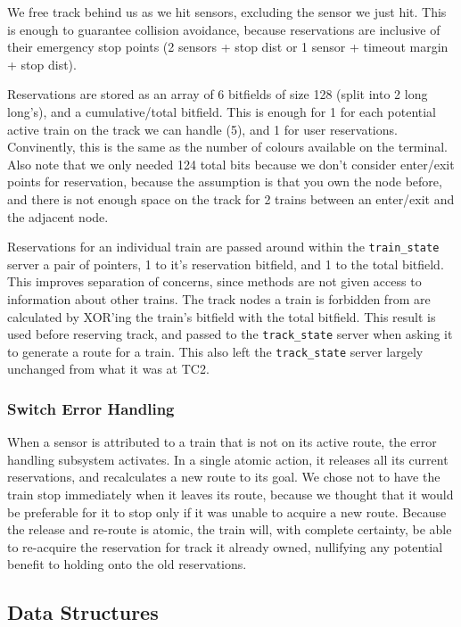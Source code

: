 \documentclass{article}
\begin{document}
We free track behind us as we hit sensors, excluding the sensor we just hit. This is enough to guarantee collision avoidance, because reservations are inclusive of their emergency stop points (2 sensors + stop dist or 1 sensor + timeout margin + stop dist).

Reservations are stored as an array of 6 bitfields of size 128 (split into 2 long long's), and a cumulative/total bitfield.
This is enough for 1 for each potential active train on the track we can handle (5), and 1 for user reservations.
Convinently, this is the same as the number of colours available on the terminal.
Also note that we only needed 124 total bits because we don't consider enter/exit points for reservation, because the assumption is that you own the node before, and there is not enough space on the track for 2 trains between an enter/exit and the adjacent node.

Reservations for an individual train are passed around within the \verb|train_state| server a pair of pointers, 1 to it's reservation bitfield, and 1 to the total bitfield. This improves separation of concerns, since methods are not given access to information about other trains. The track nodes a train is forbidden from are calculated by XOR'ing the train's bitfield with the total bitfield. This result is used before reserving track, and passed to the \verb|track_state| server when asking it to generate a route for a train. This also left the \verb|track_state| server largely unchanged from what it was at TC2.

\subsubsection{Switch Error Handling}
When a sensor is attributed to a train that is not on its active route, the error handling subsystem activates. In a single atomic action, it releases all its current reservations, and recalculates a new route to its goal. 
We chose not to have the train stop immediately when it leaves its route, because we thought that it would be preferable for it to stop only if it was unable to acquire a new route.
Because the release and re-route is atomic, the train will, with complete certainty, be able to re-acquire the reservation for track it already owned, nullifying any potential benefit to holding onto the old reservations. %

\subsection{Data Structures}
\end{document}
